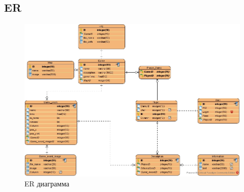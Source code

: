 \subsection{ER}
	
	\begin{figure}[H]
		\centering
		\includegraphics[width=0.7\linewidth]{src/ER}
		\caption{ER диаграмма}
		\label{fig:er}
	\end{figure}
	
	